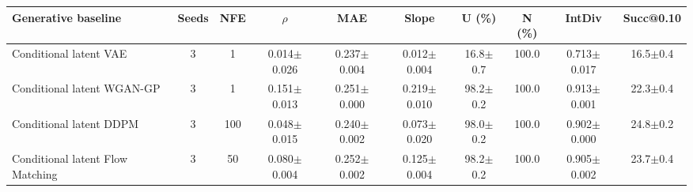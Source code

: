 \begin{tabular}{l c c c c c c c c c}
\toprule
Generative baseline & Seeds & NFE & $\rho$ & MAE & Slope & U (\%) & N (\%) & IntDiv & Succ@0.10 \\
\midrule
Conditional latent VAE & 3 & 1 & 0.014$\pm$0.026 & 0.237$\pm$0.004 & 0.012$\pm$0.004 & 16.8$\pm$0.7 & 100.0 & 0.713$\pm$0.017 & 16.5$\pm$0.4 \\
Conditional latent WGAN-GP & 3 & 1 & 0.151$\pm$0.013 & 0.251$\pm$0.000 & 0.219$\pm$0.010 & 98.2$\pm$0.2 & 100.0 & 0.913$\pm$0.001 & 22.3$\pm$0.4 \\
Conditional latent DDPM & 3 & 100 & 0.048$\pm$0.015 & 0.240$\pm$0.002 & 0.073$\pm$0.020 & 98.0$\pm$0.2 & 100.0 & 0.902$\pm$0.000 & 24.8$\pm$0.2 \\
Conditional latent Flow Matching & 3 & 50 & 0.080$\pm$0.004 & 0.252$\pm$0.002 & 0.125$\pm$0.004 & 98.2$\pm$0.2 & 100.0 & 0.905$\pm$0.002 & 23.7$\pm$0.4 \\
\bottomrule
\end{tabular}
